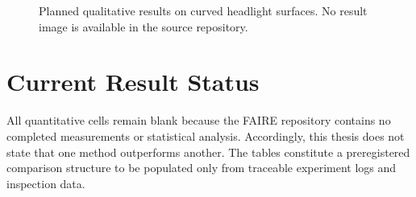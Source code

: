 \begin{figure}[t]
  \centering
  \caption{Planned qualitative results on curved headlight surfaces. No result image is available in the source repository.}
  \label{fig:experimental_results}
\end{figure}

\section{Current Result Status}
All quantitative cells remain blank because the FAIRE repository contains no completed measurements or statistical analysis. Accordingly, this thesis does not state that one method outperforms another. The tables constitute a preregistered comparison structure to be populated only from traceable experiment logs and inspection data.

